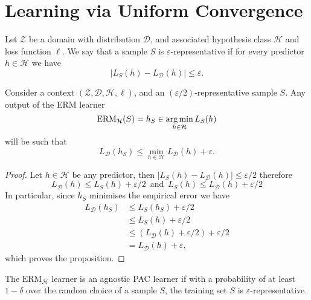 \section{Learning via Uniform Convergence}

\begin{definition}
    \label{def:epsilon-representative-sample}
    Let \(\mathcal{Z}\) be a domain with distribution \(\mathcal{D}\), and
    associated hypothesis class \(\mathcal{H}\) and loss function \(\ell\). We say
    that a sample \(S\) is \(\varepsilon\)-representative if for every predictor \(h
    \in \mathcal{H}\) we have
    \[
        |L_S(h) - L_{\mathcal{D}}(h)| \leq \varepsilon.
    \]
\end{definition}

\begin{lemma}
    \label{lem:epsilon-representative-good-erm-output}
    Consider a context \((\mathcal{Z}, \mathcal{D}, \mathcal{H}, \ell)\), and an
    \((\varepsilon/2)\)-representative sample \(S\). Any output of the ERM learner
    \[
        \text{ERM}_{\mathcal{H}}(S) = h_S \in \operatorname*{arg\,min}_{h \in \mathcal{H}} L_S(h)
    \]
    will be such that
    \[
        L_{\mathcal{D}}(h_S) \leq \min_{h \in \mathcal{H}} L_{\mathcal{D}}(h) + \varepsilon.
    \]
\end{lemma}

\begin{proof}
    Let \(h \in \mathcal{H}\) be any predictor, then
    \(|L_S(h) - L_{\mathcal{D}}(h)| \leq \varepsilon/2\) therefore
    \[
        L_{\mathcal{D}}(h) \leq L_S(h) + \varepsilon/2
        \, \text{ and }\,
        L_S(h) \leq L_{\mathcal{D}}(h) + \varepsilon/2
    \]
    In particular, since \(h_S\)
    minimises the empirical error we have
    \begin{align*}
        L_{\mathcal{D}}(h_S)
         & \leq L_S(h_S) + \varepsilon/2                             \\
         & \leq L_S(h) + \varepsilon/2                               \\
         & \leq (L_{\mathcal{D}}(h) + \varepsilon/2) + \varepsilon/2 \\
         & = L_{\mathcal{D}}(h) + \varepsilon,
    \end{align*}
    which proves the proposition.
\end{proof}

\begin{corollary}
    \label{cor:erm-is-agnostic-pac-learner-sufficient-condition}
    The \(\text{ERM}_{\mathcal{H}}\) learner is an agnostic PAC learner if with a
    probability of at least \(1- \delta\) over the random choice of a sample \(S\),
    the training set \(S\) is \(\varepsilon\)-representative.
\end{corollary}

